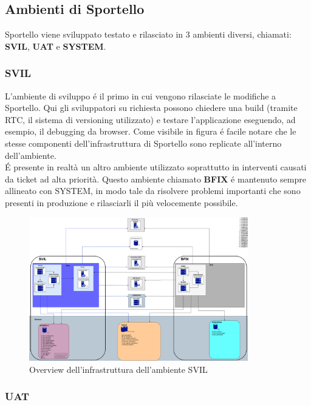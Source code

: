 \subsection{Ambienti di Sportello}

Sportello viene sviluppato testato e rilasciato in 3 ambienti diversi, chiamati: \textbf{SVIL}, \textbf{UAT} e \textbf{SYSTEM}.

\subsubsection{SVIL}

L'ambiente di sviluppo é il primo in cui vengono rilasciate le modifiche a Sportello. Qui gli sviluppatori su richiesta possono chiedere una build (tramite RTC, il sistema di versioning utilizzato) e testare l'applicazione eseguendo, ad esempio, il debugging da browser. Come visibile in figura é facile notare che le stesse componenti dell'infrastruttura di Sportello sono replicate all'interno dell'ambiente. \\
É presente in realtà un altro ambiente utilizzato soprattutto in interventi causati da ticket ad alta priorità. Questo ambiente chiamato \textbf{BFIX} é mantenuto sempre allineato con SYSTEM, in modo tale da risolvere problemi importanti che sono presenti in produzione e rilasciarli il più velocemente possibile. 


\begin{figure}[!ht]
    \centering
	\includegraphics[width=0.85\textwidth]{./res/img/svil-diag.png}
    \caption{Overview dell'infrastruttura dell'ambiente SVIL}
\end{figure}

\subsubsection{UAT}


